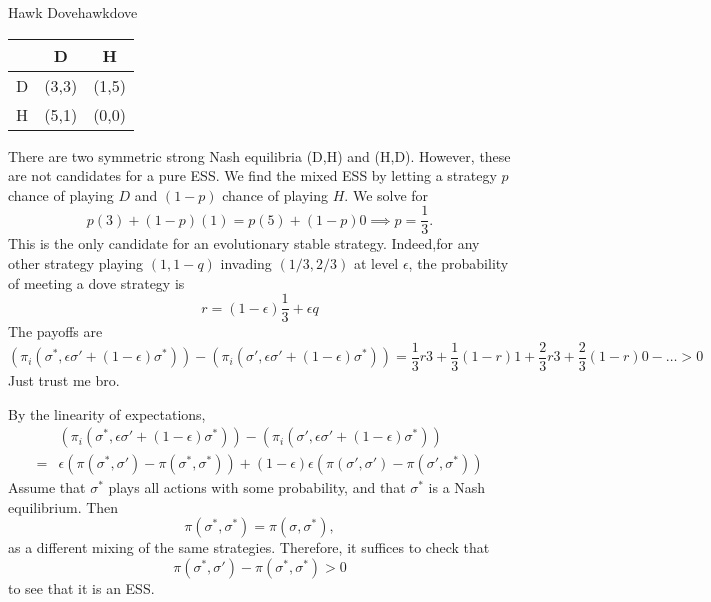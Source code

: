 \begin{aexample}{Hawk Dove}{hawkdove}
    \begin{center}
        \begin{tabular}{|c|c c|} 
            \hline &D& H \\
            
            \hline
            D&(3,3)&(1,5)\\
            \hline H&(5,1)&(0,0)
            \\ \hline
        \end{tabular}
    \end{center}

    There are two symmetric strong Nash equilibria (D,H) and (H,D). However, these are not candidates for a pure ESS. We find the mixed ESS by letting a strategy $p$ chance of playing $D$ and $(1-p)$ chance of playing $H$. We solve for \[
    p(3)+(1-p)(1)= p(5)+(1-p)0 \implies p=\frac{1}{3}.
    \]
    This is the only candidate for an evolutionary stable strategy. Indeed,for any other strategy playing $(1,1-q)$ invading $(1/3,2/3)$ at level $\epsilon$, the probability of meeting a dove strategy is \[
    r=(1-\epsilon)\frac{1}{3}+\epsilon q
    \]
    The payoffs are \[
        (\pi_i(\sigma^*,\epsilon\sigma'+(1-\epsilon)\sigma^*))-(\pi_i(\sigma',\epsilon\sigma'+(1-\epsilon)\sigma^*)) = \frac{1}{3}r3 + \frac{1}{3}(1-r)1+\frac{2}{3}r3+\frac{2}{3}(1-r)0 -\ldots >0
    \] Just trust me bro. 
\end{aexample}
By the linearity of expectations, \begin{align*}
    &(\pi_i(\sigma^*,\epsilon\sigma'+(1-\epsilon)\sigma^*))-(\pi_i(\sigma',\epsilon\sigma'+(1-\epsilon)\sigma^*)) \\=& \epsilon(\pi(\sigma^*,\sigma')-\pi(\sigma^*,\sigma^*)) + (1-\epsilon)\epsilon(\pi(\sigma',\sigma')-\pi(\sigma',\sigma^*)) 
\end{align*}
Assume that $\sigma^*$ plays all actions with some probability, and that $\sigma^*$ is a Nash equilibrium. Then \[
\pi(\sigma^*,\sigma^*)=\pi(\sigma,\sigma^*),
\]
as a different mixing of the same strategies. Therefore, it suffices to check that \[
    \pi(\sigma^*,\sigma')-\pi(\sigma^*,\sigma^*)>0
\]to see that it is an ESS.

